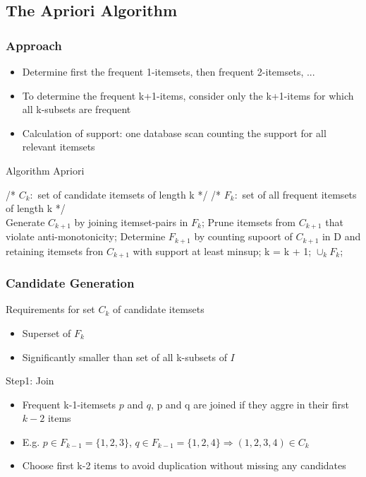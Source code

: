 \documentclass{article}
\begin{document}
\subsection{The Apriori Algorithm}
\subsubsection{Approach}
\begin{itemize}
  \item Determine first the frequent 1-itemsets, then frequent 2-itemsets, ...
  \item To determine the frequent k+1-items, consider only the k+1-items for which all k-subsets are frequent
  \item Calculation of support: one database scan counting the support for all relevant itemsets
\end{itemize}

\begin{algorithm}
\caption{Algorithm Apriori}
\begin{algorithmic}[0]
\State /* $C_k:$ set of candidate itemsets of length k */
\State /* $F_k:$ set of all frequent itemsets of length k */ \\
  \State Generate $C_{k+1}$ by joining itemset-pairs in $F_k$;
  \State Prune itemsets from $C_{k+1}$ that violate anti-monotonicity;
  \State Determine $F_{k+1}$ by counting supoort of $C_{k+1}$ in D and retaining itemsets fron $C_{k+1}$ with support at least minsup;
  \State k = k + 1;
\EndWhile
\Return $\cup_k F_k$;
\EndFunction
\end{algorithmic}
\end{algorithm}

\newpage

\subsubsection{Candidate Generation}
Requirements for set $C_k$ of candidate itemsets
\begin{itemize}
  \item Superset of $F_k$
  \item Significantly smaller than set of all k-subsets of $I$
\end{itemize}

Step1: Join
\begin{itemize}
  \item Frequent k-1-itemsets $p$ and $q$, p and q are joined if they aggre in their first $k-2$ items
  \item E.g. $p \in F_{k-1} = \{1,2,3\}$, $q \in F_{k-1} = \{1,2,4\} \Rightarrow (1,2,3,4) \in C_k$
  \item Choose first k-2 items to avoid duplication without missing any candidates
\end{itemize}
\end{document}
